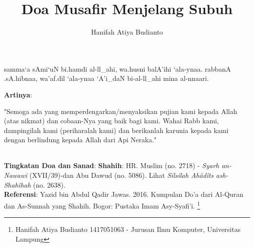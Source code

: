 \documentclass[a4paper,12pt]{article}
\title{\Large Doa Musafir Menjelang Subuh}
\author{\calligra Hanifah Atiya Budianto}
\begin{document}
\sffamily
\maketitle 
\fullvocalize
{}
\begin{arabtext}
\noindent
samma`a sAmi`uN bi.hamdi al-ll_ahi, wa.husni balA'ihi `ala-ynaa. rabbanA 
.sA.hibnaa, wa'af.dil `ala-ynaa `A'i_daN bi-al-ll_ahi mina al-nnaari.\\
\end{arabtext}
\noindent
\textbf{Artinya}:
\par
\indent
"Semoga ada yang memperdengarkan/menyaksikan pujian kami kepada Allah (atas
nikmat) dan cobaan-Nya yang baik bagi kami. Wahai Rabb kami, dampingilah 
kami (periharalah kami) dan berikanlah karunia kepada kami dengan 
berlindung kepada Allah dari Api Neraka."\\\\
\par
\noindent
\textbf{Tingkatan Doa dan Sanad}: \textbf{Shahih}: HR. Muslim (no. 2718)
- \textit{Syarh an-Nawawi} (XVII/39)-dan Abu Dawud (no.  5086). Lihat 
\textit{Silsilah Ah\^{a}d\^{i}ts ash-Shah\^{i}hah} (no. 2638). \\
\textbf{Referensi}: Yazid bin Abdul Qadir Jawas. 2016. Kumpulan Do'a dari
Al-Quran dan As-Sunnah yang Shahih. Bogor: Pustaka Imam Asy-Syafi'i.
\footnote{Hanifah Atiya Budianto 1417051063 - Jurusan Ilmu Komputer,
Universitas Lampung}
\end{document}
